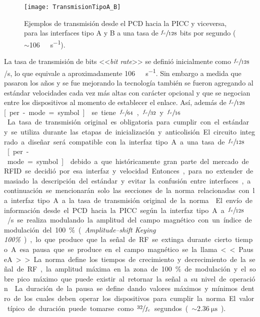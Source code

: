 \begin{figure}
	\centering
	\texttt{[image: TransmisionTipoA\_B]}
	\caption{Ejemplos de transmisión desde el PCD hacia la PICC y viceversa, 
	para las interfaces tipo A y B a una tasa de \(\sfrac{f_c}{128}\) bits 
	por segundo (\(\sim\)\SI[per-mode=symbol]{106}{\kilo\bit\per\second}).}
	\label{fig:TransmisionTipoA_B}
\end{figure}

La tasa de transmisión de bits <<\emph{bit rate}>> se definió inicialmente 
como \(\sfrac{f_c}{128}\) \si[per-mode=symbol]{\bit\per\second}, lo que 
equivale a aproximadamente \SI[per-mode=symbol]{106}{\kilo\bit\per\second}. 
Sin embargo a medida que pasaron los años y se fue mejorando la tecnología 
también se fueron agregando al estándar velocidades cada vez más altas con 
carácter opcional y que se negocian entre los dispositivos al momento de 
establecer el enlace. Así, además de \(\sfrac{f_c}{128}\) \si
[per-mode=symbol]{\bit\per\second} se tiene \(\sfrac{f_c}{64}\), \(
\sfrac{f_c}{32}\) y \(\sfrac{f_c}{16}\) \si[per-mode=symbol]{\bit\per\second
}. La tasa de transmisión original es obligatoria para cumplir con el 
estándar y se utiliza durante las etapas de inicialización y anticolisión. 

El circuito integrado a diseñar será 
compatible con la interfaz tipo A a una tasa de \(\sfrac{f_c}{128}\) \si
[per-mode=symbol]{\bit\per\second} debido a que históricamente gran parte 
del mercado de RFID se decidió por esa interfaz y velocidad. Entonces, para 
no extender demasiado la descripción del estándar y evitar la confusión 
entre interfaces, a continuación se mencionarán solo las secciones de la 
norma relacionadas con la interfaz tipo A a la tasa de transmisión original 
de la norma.

\bigskip
El envío de información desde el PCD hacia la PICC según la 
interfaz tipo A a \(\sfrac{f_c}{128}\) \si[per-mode=symbol]{\bit\per\second} 
se realiza modulando la amplitud del campo magnético con un índice de 
modulación del 100\% (\emph{Amplitude--shift Keying 100\%}), lo que produce 
que la señal de RF se extinga durante cierto tiempo. A esa pausa que se 
produce en el campo magnético se la llama <<PauseA>>. La norma define los 
tiempos de crecimiento y decrecimiento de la señal de RF, la amplitud máxima 
en la zona de 100\% de modulación y el sobre pico máximo que puede existir 
al retornar la señal a su nivel de operación \cite[pág.~7]{ISO14443Part2}. 
La duración de la pausa se define dando valores máximos y mínimos dentro de 
los cuales deben operar los dispositivos para cumplir la norma. El valor 
típico de duración puede tomarse como \(\sfrac{32}{f_c}\) segundos (\(
\sim\SI{2.36}{\micro\second}\)).


